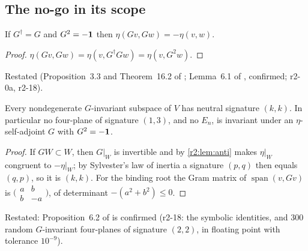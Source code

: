 \subsection{The no-go in its scope}
\label{r2:sec:nogo}

\begin{lemma}
\label{r2:lem:anti}
If $G^\dagger=G$ and $G^2=-\mathbf 1$ then $\eta(Gv,Gw)=-\eta(v,w)$.
\end{lemma}

\begin{proof}
$\eta(Gv,Gw)=\eta(v,G^\dagger Gw)=\eta(v,G^2w)$.
\end{proof}

Restated (Proposition~3.3 and Theorem~16.2 of \cite{ES17}; Lemma~6.1 of \cite{FMB}, confirmed; r2-0a, r2-18).

\begin{proposition}
\label{r2:prop:nogo}
Every nondegenerate $G$-invariant subspace of $V$ has neutral signature $(k,k)$. In particular no four-plane of signature $(1,3)$, and no $E_n$, is
invariant under an $\eta$-self-adjoint $G$ with $G^2=-\mathbf 1$.
\end{proposition}

\begin{proof}
If $GW\subset W$, then $G|_W$ is invertible and by \cref{r2:lem:anti} makes $\eta|_W$ congruent to $-\eta|_W$; by Sylvester's law of inertia
\cite{ONeill83} a signature $(p,q)$ then equals $(q,p)$, so it is $(k,k)$. For the binding root the Gram matrix of $\operatorname{span}(v,Gv)$ is
$\bigl(\begin{smallmatrix}a&b\\b&-a\end{smallmatrix}\bigr)$, of determinant $-(a^2+b^2)\le0$.
\end{proof}

Restated: Proposition~6.2 of \cite{FMB} is confirmed (r2-18: the symbolic identities, and 300 random $G$-invariant four-planes of signature $(2,2)$, in floating point
with tolerance $10^{-9}$).

